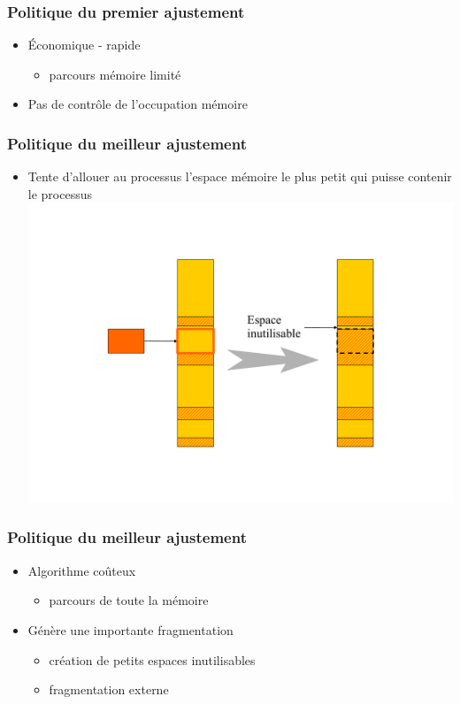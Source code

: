 \begin{frame}
\frametitle{Politique du premier ajustement}
\begin{itemize}
\item Économique - rapide
\begin{itemize}
\item parcours mémoire limité
\end{itemize}
\item Pas de contrôle de l'occupation mémoire
\end{itemize}
\end{frame}


\begin{frame}
\frametitle{Politique du meilleur ajustement}
\begin{itemize}
\item Tente d’allouer au processus l’espace mémoire le plus petit qui puisse contenir le processus
\includegraphics[width=.7\textwidth]{../illustration/memoire_principale_meilleur_ajustement.pdf}
\end{itemize}
\end{frame}


\begin{frame}
\frametitle{Politique du meilleur ajustement}
\begin{itemize}
\item Algorithme coûteux
\begin{itemize}
\item parcours de toute la mémoire
\end{itemize}
\item Génère une importante fragmentation
\begin{itemize}
\item création de petits espaces inutilisables
\item fragmentation externe
\end{itemize}
\end{itemize}
\end{frame}


